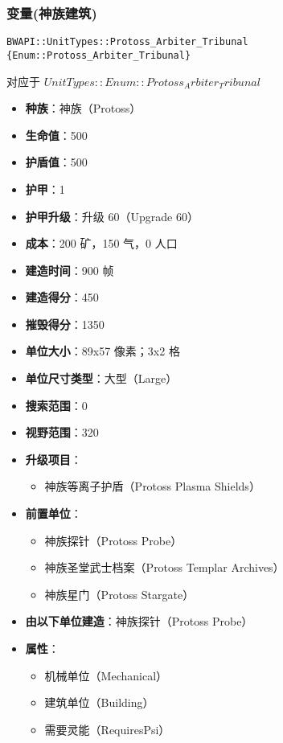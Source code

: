 \subsubsection{变量(神族建筑)}

\begin{tcolorbox}[colback=white, colframe=black!60!white, title=Protoss\_Arbiter\_Tribunal(), arc=0mm]
    \begin{verbatim}
BWAPI::UnitTypes::Protoss_Arbiter_Tribunal {Enum::Protoss_Arbiter_Tribunal}
    \end{verbatim}
    对应于  $ UnitTypes::Enum::Protoss_Arbiter_Tribunal $ 
    \begin{itemize}
        \item \textbf{种族}：神族（Protoss）
        \item \textbf{生命值}：500
        \item \textbf{护盾值}：500
        \item \textbf{护甲}：1
        \item \textbf{护甲升级}：升级 60（Upgrade 60）
        \item \textbf{成本}：200 矿，150 气，0 人口
        \item \textbf{建造时间}：900 帧
        \item \textbf{建造得分}：450
        \item \textbf{摧毁得分}：1350
        \item \textbf{单位大小}：89x57 像素；3x2 格
        \item \textbf{单位尺寸类型}：大型（Large）
        \item \textbf{搜索范围}：0
        \item \textbf{视野范围}：320
        \item \textbf{升级项目}：
            \begin{itemize}
                \item 神族等离子护盾（Protoss Plasma Shields）
            \end{itemize}
        \item \textbf{前置单位}：
            \begin{itemize}
                \item 神族探针（Protoss Probe）
                \item 神族圣堂武士档案（Protoss Templar Archives）
                \item 神族星门（Protoss Stargate）
            \end{itemize}
        \item \textbf{由以下单位建造}：神族探针（Protoss Probe）
        \item \textbf{属性}：
            \begin{itemize}
                \item 机械单位（Mechanical）
                \item 建筑单位（Building）
                \item 需要灵能（RequiresPsi）
            \end{itemize}
    \end{itemize}
\end{tcolorbox}

